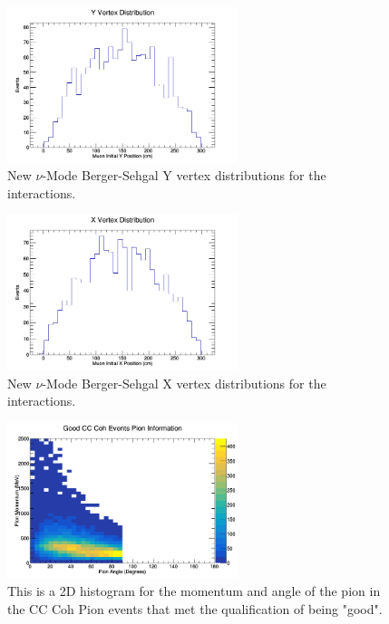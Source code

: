 \documentclass[11pt]{article}
\begin{document}
\begin{figure}[H]
\centering
\includegraphics[width=0.6\textwidth]{NewNMBergerSehgalImages/3-YVertexDistributionNMBS.png}
\caption{New $\nu$-Mode Berger-Sehgal Y vertex distributions for the interactions.}
\end{figure}

\begin{figure}[H]
\centering
\includegraphics[width=0.6\textwidth]{NewNMBergerSehgalImages/4-XVertexDistributionNMBS.png}
\caption{New $\nu$-Mode Berger-Sehgal X vertex distributions for the interactions.}
\end{figure}

\begin{figure}[H]
\centering
\includegraphics[width=0.6\textwidth]{NewNMBergerSehgalImages/5-GoodCCCohPionInfoNMBS.png}
\caption{This is a 2D histogram for the momentum and angle of the pion in the CC Coh Pion events that met the qualification of being "good".}
\end{figure}
\end{document}
